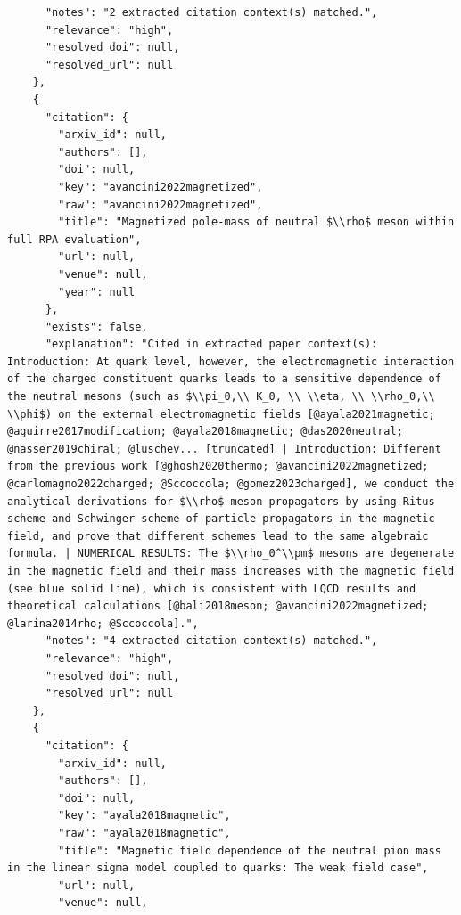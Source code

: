 \documentclass[11pt]{article}
\begin{document}
\begin{verbatim}
      "notes": "2 extracted citation context(s) matched.",
      "relevance": "high",
      "resolved_doi": null,
      "resolved_url": null
    },
    {
      "citation": {
        "arxiv_id": null,
        "authors": [],
        "doi": null,
        "key": "avancini2022magnetized",
        "raw": "avancini2022magnetized",
        "title": "Magnetized pole-mass of neutral $\\rho$ meson within full RPA evaluation",
        "url": null,
        "venue": null,
        "year": null
      },
      "exists": false,
      "explanation": "Cited in extracted paper context(s): Introduction: At quark level, however, the electromagnetic interaction of the charged constituent quarks leads to a sensitive dependence of the neutral mesons (such as $\\pi_0,\\ K_0, \\ \\eta, \\ \\rho_0,\\ \\phi$) on the external electromagnetic fields [@ayala2021magnetic; @aguirre2017modification; @ayala2018magnetic; @das2020neutral; @nasser2019chiral; @luschev... [truncated] | Introduction: Different from the previous work [@ghosh2020thermo; @avancini2022magnetized; @carlomagno2022charged; @Sccoccola; @gomez2023charged], we conduct the analytical derivations for $\\rho$ meson propagators by using Ritus scheme and Schwinger scheme of particle propagators in the magnetic field, and prove that different schemes lead to the same algebraic formula. | NUMERICAL RESULTS: The $\\rho_0^\\pm$ mesons are degenerate in the magnetic field and their mass increases with the magnetic field (see blue solid line), which is consistent with LQCD results and theoretical calculations [@bali2018meson; @avancini2022magnetized; @larina2014rho; @Sccoccola].",
      "notes": "4 extracted citation context(s) matched.",
      "relevance": "high",
      "resolved_doi": null,
      "resolved_url": null
    },
    {
      "citation": {
        "arxiv_id": null,
        "authors": [],
        "doi": null,
        "key": "ayala2018magnetic",
        "raw": "ayala2018magnetic",
        "title": "Magnetic field dependence of the neutral pion mass in the linear sigma model coupled to quarks: The weak field case",
        "url": null,
        "venue": null,

\end{verbatim}
\end{document}
